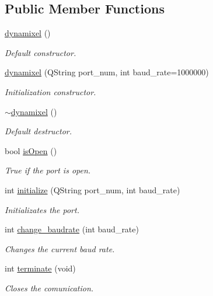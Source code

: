 \subsection*{Public Member Functions}
\begin{DoxyCompactItemize}
\item 
\hyperlink{a00004_a7aa668a213db6a41bede8e08a6fec830}{dynamixel} ()
\begin{DoxyCompactList}\small\item\em Default constructor. \end{DoxyCompactList}\item 
\hyperlink{a00004_a5d4fed957a4b2d1690c0fa72127f5cbf}{dynamixel} (Q\+String port\+\_\+num, int baud\+\_\+rate=1000000)
\begin{DoxyCompactList}\small\item\em Initialization constructor. \end{DoxyCompactList}\item 
\hyperlink{a00004_a58fec564d9417d2d09bc29003a9feb7a}{$\sim$dynamixel} ()
\begin{DoxyCompactList}\small\item\em Default destructor. \end{DoxyCompactList}\item 
bool \hyperlink{a00004_a5ae4b2c6eb4c91f404f973ee8e6a1914}{is\+Open} ()
\begin{DoxyCompactList}\small\item\em True if the port is open. \end{DoxyCompactList}\item 
int \hyperlink{a00004_a87960244d5846ae7583e37d2407eb61e}{initialize} (Q\+String port\+\_\+num, int baud\+\_\+rate)
\begin{DoxyCompactList}\small\item\em Initializates the port. \end{DoxyCompactList}\item 
int \hyperlink{a00004_a7554c7889896e29e11a62027d89f3fdf}{change\+\_\+baudrate} (int baud\+\_\+rate)
\begin{DoxyCompactList}\small\item\em Changes the current baud rate. \end{DoxyCompactList}\item 
int \hyperlink{a00004_a92ea074ed1c1a9cf29e039f8c425f01a}{terminate} (void)
\begin{DoxyCompactList}\small\item\em Closes the comunication. \end{DoxyCompactList}\item 

\end{DoxyCompactItemize}
